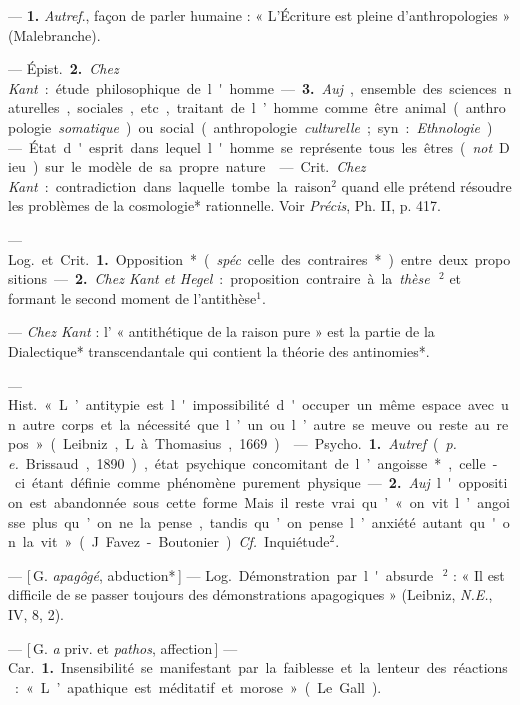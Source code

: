 \begin{itemize}[leftmargin=1cm, label=, itemsep=1pt]
{ — {\bf 1.} {\it Autref}., façon de
parler humaine : « L’Écriture est
pleine d’anthropologies » (Malebranche).

— \si{Épist.} {\bf 2.} {\it Chez Kant} : étude
philosophique de l'homme. — {\bf 3.}
{\it Auj}., ensemble des sciences naturelles, sociales, etc., traitant de
l’homme comme être animal (anthropologie {\it somatique})
ou social (anthropologie {\it culturelle}; syn. : {\it Ethnologie}).

 — État d'esprit
dans lequel l'homme se représente
tous les êtres ({\it not}. Dieu) sur le
modèle de sa propre nature.

 — \si{Crit.} {\it Chez Kant} : contradiction
dans laquelle tombe la
raison$^2$ quand elle prétend résoudre
les problèmes de la cosmologie*
rationnelle. Voir {\it Précis}, Ph. II,
p. 417.

 — \si{Log.} et \si{Crit.} {\bf 1.} Opposition*
({\it spéc}. celle des contraires*) entre
deux propositions. — {\bf 2.} {\it Chez Kant
et Hegel} : proposition contraire à la
{\it thèse}\,$^2$ et formant le second moment
de l’antithèse$^1$.

 — {\it Chez Kant} : l’ « antithétique de la raison pure » est la
partie de la Dialectique* transcendantale qui contient la théorie des
antinomies*.

 — \si{Hist.} « L’antitypie est
l'impossibilité d'occuper un même
espace avec un autre corps et la
nécessité que l’un ou l’autre se
meuve ou reste au repos » (Leibniz,
L. à Thomasius, 1669).

 — \si{Psycho.} {\bf 1.} {\it Autref}. ({\it p. e.}
Brissaud, 1890), état psychique
concomitant de l’angoisse*, celle-ci
étant définie comme phénomène
purement physique. — {\bf 2.} {\it Auj}.
l'opposition est abandonnée sous
cette forme. Mais il reste vrai qu’ « on
vit l’angoisse plus qu’on ne la pense,
tandis qu’on pense l’anxiété autant
qu'on la vit » (J. Favez-Boutonier).
{\it Cf.}  Inquiétude$^2$.

 — [\,G. {\it apagôgé}, abduction*\,]
— \si{Log.} Démonstration par l'absurde\,$^2$ : « Il est
difficile de se passer toujours des
démonstrations apagogiques » (Leibniz, {\it N.E.}, IV, 8, 2).

 — [\,G. {\it a} priv. et {\it pathos}, affection\,]
— \si{Car.} {\bf 1.} Insensibilité se
manifestant par la faiblesse et la
lenteur des réactions : « L’apathique
est méditatif et morose » (Le Gall).

}
\end{itemize}
